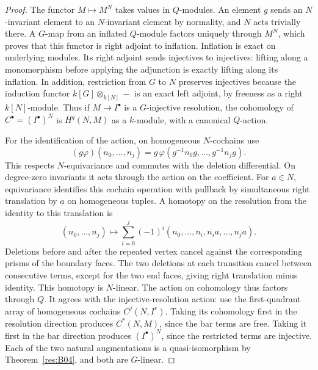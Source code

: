\begin{proof}
The functor \(M\mapsto M^N\) takes values in \(Q\)-modules. An
element \(g\) sends an \(N\)-invariant element to an \(N\)-invariant
element by normality, and \(N\) acts trivially there. A \(G\)-map
from an inflated \(Q\)-module factors uniquely through \(M^N\),
which proves that this functor is right adjoint to inflation.
Inflation is exact on underlying modules. Its right adjoint
sends injectives to injectives: lifting along a monomorphism
before applying the adjunction is exactly lifting along its
inflation. In addition, restriction from \(G\) to \(N\) preserves
injectives because the induction functor \(k[G]\otimes_{k[N]}-\)
is an exact left adjoint, by freeness as a right \(k[N]\)-module.
Thus if \(M\to I^\bullet\) is a \(G\)-injective resolution, the
cohomology of \(C^\bullet=(I^\bullet)^N\) is \(H^q(N,M)\) as a
\(k\)-module, with a canonical \(Q\)-action.

For the identification of the action, on homogeneous \(N\)-cochains
use
\[
 (g\varphi)(n_0,\ldots,n_j)
 =g\,\varphi(g^{-1}n_0g,\ldots,g^{-1}n_jg).
\]
This respects \(N\)-equivariance and commutes with the deletion
differential. On degree-zero invariants it acts through the action
on the coefficient. For \(a\in N\), equivariance identifies this
cochain operation with pullback by simultaneous right translation
by \(a\) on homogeneous tuples. A homotopy on the resolution from
the identity to this translation is
\[
 (n_0,\ldots,n_j)\longmapsto
 \sum_{i=0}^{j}(-1)^i
 (n_0,\ldots,n_i,n_i a,\ldots,n_j a).
\]
Deletions before and after the repeated vertex cancel against the
corresponding prisms of the boundary faces. The two deletions at
each transition cancel between consecutive terms, except for the
two end faces, giving right translation minus identity. This homotopy
is \(N\)-linear. The action on cohomology thus factors through \(Q\).
It agrees with the injective-resolution action: use the
first-quadrant array of homogeneous cochains \(C^j(N,I^r)\).
Taking its cohomology first in the resolution direction produces
\(C^*(N,M)\), since the bar terms are free. Taking it first in the
bar direction produces \((I^\bullet)^N\), since the restricted
terms are injective. Each of the two natural augmentations is a
quasi-isomorphism by Theorem~\ref{res:B04}, and both are \(G\)-linear.


\end{proof}
